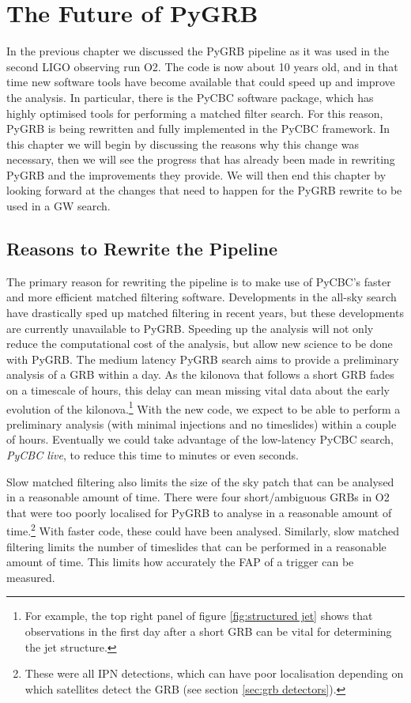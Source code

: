 \documentclass[11pt]{cuthesis}
\begin{document}
\chapter{The Future of PyGRB} \label{chap:pygrb future}
In the previous chapter we discussed the PyGRB pipeline as it was used in the second LIGO observing run O2. The code is now about 10 years old, and in that time new software tools have become available that could speed up and improve the analysis. In particular, there is the PyCBC software package, \cite{pycbc_Allen:2004, pycbc_Allen:2005, pycbc_Canton:2014, pycbc_Nitz:2017, pycbc_Usman:2015} which has highly optimised tools for performing a matched filter search. For this reason, PyGRB is being rewritten and fully implemented in the PyCBC framework. In this chapter we will begin by discussing the reasons why this change was necessary, then we will see the progress that has already been made in rewriting PyGRB and the improvements they provide. We will then end this chapter by looking forward at the changes that need to happen for the PyGRB rewrite to be used in a GW search.


\section{Reasons to Rewrite the Pipeline} \label{sec:reasons to rewrite}
The primary reason for rewriting the pipeline is to make use of PyCBC's faster and more efficient matched filtering software. Developments in the all-sky search have drastically sped up matched filtering in recent years, but these developments are currently unavailable to PyGRB. Speeding up the analysis will not only reduce the computational cost of the analysis, but allow new science to be done with PyGRB. The medium latency PyGRB search aims to provide a preliminary analysis of a GRB within a day. As the kilonova that follows a short GRB fades on a timescale of hours, this delay can mean missing vital data about the early evolution of the kilonova.\footnote{For example, the top right panel of figure \ref{fig:structured jet} shows that observations in the first day after a short GRB can be vital for determining the jet structure.} With the new code, we expect to be able to perform a preliminary analysis (with minimal injections and no timeslides) within a couple of hours. Eventually we could take advantage of the low-latency PyCBC search, \textit{PyCBC live}, \cite{pycbc_live} to reduce this time to minutes or even seconds. 

Slow matched filtering also limits the size of the sky patch that can be analysed in a reasonable amount of time. There were four short/ambiguous GRBs in O2 that were too poorly localised for PyGRB to analyse in a reasonable amount of time.\footnote{These were all IPN detections, which can have poor localisation depending on which satellites detect the GRB (see section \ref{sec:grb detectors}).} With faster code, these could have been analysed. Similarly, slow matched filtering limits the number of timeslides that can be performed in a reasonable amount of time. This limits how accurately the FAP of a trigger can be measured.
\end{document}
